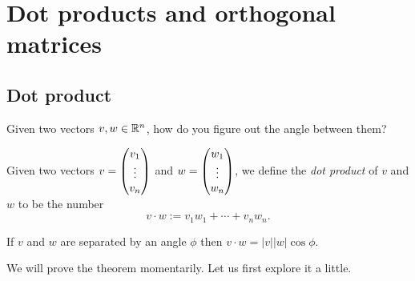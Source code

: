 \documentclass{article}
\begin{document}
\clearpage


\section{Dot products and orthogonal matrices}
\subsection{Dot product}


Given two vectors \(v,w\in\mathbb{R}^n\), how do you figure out the angle
between them?


\begin{Definition}\label{dfn:dotproduct}
Given two vectors \(v=\begin{pmatrix} v_1\\ \vdots\\ v_n\end{pmatrix}\) and \(w=\begin{pmatrix}
w_1\\ \vdots\\ w_n\end{pmatrix}\), we define the {\em dot product} of \(v\)
and \(w\) to be the number \[v\cdot w:=v_1w_1+\cdots+v_nw_n.\]


\end{Definition}
\begin{Theorem}\label{thm:dot}
If \(v\) and \(w\) are separated by an angle \(\phi\) then \(v\cdot
w=|v||w|\cos\phi\).


\end{Theorem}
We will prove the theorem momentarily. Let us first explore it a
little.
\end{document}

